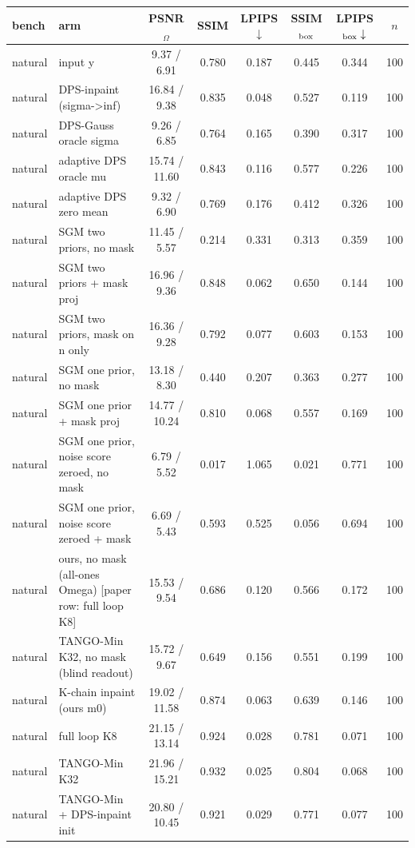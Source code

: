 \begin{tabular}{llcccccc}
\toprule
bench & arm & PSNR$_\Omega$ & SSIM & LPIPS$\downarrow$ & SSIM$_{\rm box}$ & LPIPS$_{\rm box}\downarrow$ & $n$\\
\midrule
natural & input y & 9.37 / 6.91 & 0.780 & 0.187 & 0.445 & 0.344 & 100\\
natural & DPS-inpaint (sigma->inf) & 16.84 / 9.38 & 0.835 & 0.048 & 0.527 & 0.119 & 100\\
natural & DPS-Gauss oracle sigma & 9.26 / 6.85 & 0.764 & 0.165 & 0.390 & 0.317 & 100\\
natural & adaptive DPS oracle mu & 15.74 / 11.60 & 0.843 & 0.116 & 0.577 & 0.226 & 100\\
natural & adaptive DPS zero mean & 9.32 / 6.90 & 0.769 & 0.176 & 0.412 & 0.326 & 100\\
natural & SGM two priors, no mask & 11.45 / 5.57 & 0.214 & 0.331 & 0.313 & 0.359 & 100\\
natural & SGM two priors + mask proj & 16.96 / 9.36 & 0.848 & 0.062 & 0.650 & 0.144 & 100\\
natural & SGM two priors, mask on n only & 16.36 / 9.28 & 0.792 & 0.077 & 0.603 & 0.153 & 100\\
natural & SGM one prior, no mask & 13.18 / 8.30 & 0.440 & 0.207 & 0.363 & 0.277 & 100\\
natural & SGM one prior + mask proj & 14.77 / 10.24 & 0.810 & 0.068 & 0.557 & 0.169 & 100\\
natural & SGM one prior, noise score zeroed, no mask & 6.79 / 5.52 & 0.017 & 1.065 & 0.021 & 0.771 & 100\\
natural & SGM one prior, noise score zeroed + mask & 6.69 / 5.43 & 0.593 & 0.525 & 0.056 & 0.694 & 100\\
natural & ours, no mask (all-ones Omega) [paper row: full loop K8] & 15.53 / 9.54 & 0.686 & 0.120 & 0.566 & 0.172 & 100\\
natural & TANGO-Min K32, no mask (blind readout) & 15.72 / 9.67 & 0.649 & 0.156 & 0.551 & 0.199 & 100\\
natural & K-chain inpaint (ours m0) & 19.02 / 11.58 & 0.874 & 0.063 & 0.639 & 0.146 & 100\\
natural & full loop K8 & 21.15 / 13.14 & 0.924 & 0.028 & 0.781 & 0.071 & 100\\
natural & TANGO-Min K32 & 21.96 / 15.21 & 0.932 & 0.025 & 0.804 & 0.068 & 100\\
natural & TANGO-Min + DPS-inpaint init & 20.80 / 10.45 & 0.921 & 0.029 & 0.771 & 0.077 & 100\\

\end{tabular}
